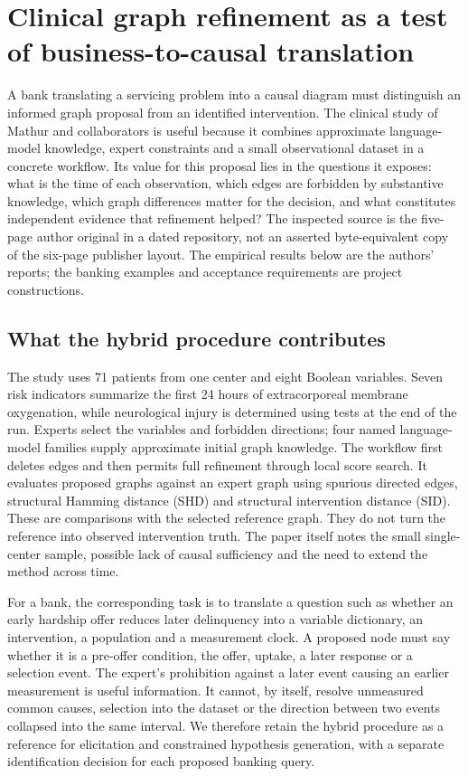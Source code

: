 \section{Clinical graph refinement as a test of business-to-causal translation}
\label{sec:exec25-ecmo}
A bank translating a servicing problem into a causal diagram must distinguish
an informed graph proposal from an identified intervention. The clinical study
of Mathur and collaborators is useful because it combines approximate language-model
knowledge, expert constraints and a small observational dataset in a concrete
workflow. Its value for this proposal lies in the questions it exposes: what is
the time of each observation, which edges are forbidden by substantive knowledge,
which graph differences matter for the decision, and what constitutes independent
evidence that refinement helped? The inspected source is the five-page author
original in a dated repository, not an asserted byte-equivalent copy of the
six-page publisher layout. The empirical results below are the authors' reports;
the banking examples and acceptance requirements are project constructions.
\citep{exec24_ecmo_original,exec24_ecmo_reference}

\subsection{What the hybrid procedure contributes}
The study uses 71 patients from one center and eight Boolean variables. Seven
risk indicators summarize the first 24 hours of extracorporeal membrane
oxygenation, while neurological injury is determined using tests at the end of
the run. Experts select the variables and forbidden directions; four named
language-model families supply approximate initial graph knowledge. The workflow
first deletes edges and then permits full refinement through local score search.
It evaluates proposed graphs against an expert graph using spurious directed
edges, structural Hamming distance (SHD) and structural intervention distance
(SID). These are comparisons with the selected reference graph. They do not
turn the reference into observed intervention truth. The paper itself notes
the small single-center sample, possible lack of causal sufficiency and the need
to extend the method across time.~\citep{exec24_ecmo_original}

For a bank, the corresponding task is to translate a question such as whether
an early hardship offer reduces later delinquency into a variable dictionary,
an intervention, a population and a measurement clock. A proposed node must say
whether it is a pre-offer condition, the offer, uptake, a later response or a
selection event. The expert's prohibition against a later event causing an
earlier measurement is useful information. It cannot, by itself, resolve
unmeasured common causes, selection into the dataset or the direction between
two events collapsed into the same interval. We therefore retain the hybrid
procedure as a reference for elicitation and constrained hypothesis generation,
with a separate identification decision for each proposed banking query.
\citep{exec24_ecmo_reference}


